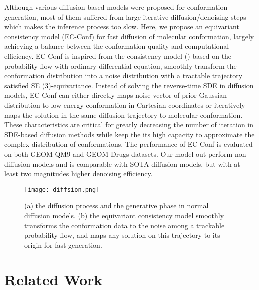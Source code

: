 \documentclass{article} %
\begin{document}
Although various diffusion-based models were proposed for conformation generation, most of them suffered from large iterative diffusion/denoising steps which makes the inference process too slow. Here, we propose an equivariant consistency model (EC-Conf) for fast diffusion of molecular conformation, largely achieving a balance between the conformation quality and computational efficiency. EC-Conf is inspired from the consistency model (\cite{song2023consistency}) based on the probability flow with ordinary differential equation, smoothly transform the conformation distribution into a noise distribution with a tractable trajectory satisfied SE (3)-equivariance. Instead of solving the reverse-time SDE in diffusion models,
 EC-Conf can either directly maps noise vector of prior Gaussian distribution to low-energy conformation in Cartesian coordinates or iteratively maps the solution in the same diffusion trajectory to molecular conformation.
 These characteristics are critical for greatly decreasing the number of iteration in SDE-based diffusion methods while keep the its high capacity to approximate the complex distribution of conformations. The performance of EC-Conf is evaluated on both GEOM-QM9 and GEOM-Drugs datasets. Our model out-perform non-diffusion models and is comparable with SOTA diffusion models, but with at least two magnitudes higher denoising efficiency. 


\begin{figure*}[htbp]
	\centerline{\texttt{[image: diffsion.png]}}
	\caption{(a) the diffusion process and the generative phase in normal diffusion models. (b) the equivariant consistency model smoothly transforms the conformation data to the noise among a trackable probability flow, and maps any solution on this trajectory to its origin for fast generation.}
	\label{fig2}
\end{figure*}




\section{Related Work}
\end{document}
